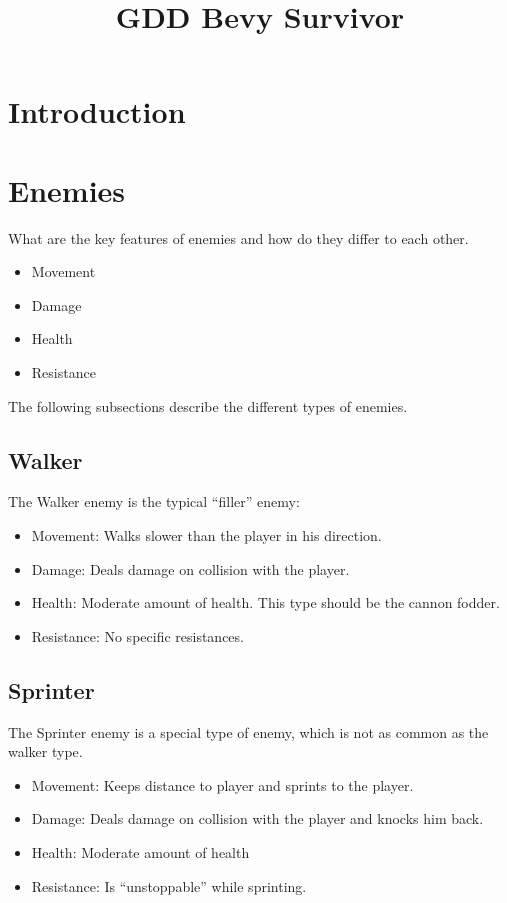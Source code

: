 \documentclass[12pt]{article}
\title{GDD Bevy Survivor}
\begin{document}
\maketitle
\newpage

\tableofcontents
\section{Introduction}

\newpage
\section{Enemies}
What are the key features of enemies and how do they differ to each other.

\begin{itemize}
    \item Movement 
    \item Damage
    \item Health 
    \item Resistance
\end{itemize}

The following subsections describe the different types of enemies. 
\subsection{Walker}
The Walker enemy is the typical “filler” enemy:
\begin{itemize}
    \item Movement: Walks slower than the player in his direction. 
    \item Damage: Deals damage on collision with the player. 
    \item Health: Moderate amount of health. This type should be the cannon fodder. 
    \item Resistance: No specific resistances.
\end{itemize}

\subsection{Sprinter}
The Sprinter enemy is a special type of enemy, which is not as common as the walker type. 
\begin{itemize}
    \item Movement: Keeps distance to player and sprints to the player. 
    \item Damage: Deals damage on collision with the player and knocks him back. 
    \item Health: Moderate amount of health
    \item Resistance: Is “unstoppable” while sprinting.
\end{itemize}
\end{document}

